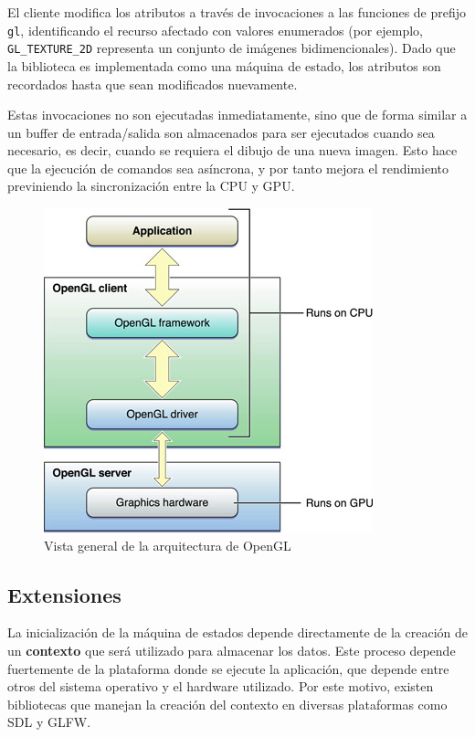 El cliente modifica los atributos a través de invocaciones a las funciones de prefijo \verb|gl|, identificando el recurso afectado con valores enumerados (por ejemplo, \verb|GL_TEXTURE_2D| representa un conjunto de imágenes bidimencionales). Dado que la biblioteca es implementada como una máquina de estado, los atributos son recordados hasta que sean modificados nuevamente.

Estas invocaciones no son ejecutadas inmediatamente, sino que de forma similar a un buffer de entrada/salida son almacenados para ser ejecutados cuando sea necesario, es decir, cuando se requiera el dibujo de una nueva imagen. Esto hace que la ejecución de comandos sea asíncrona, y por tanto mejora el rendimiento previniendo la sincronización entre la CPU y GPU.

\vspace{5mm}
\begin{figure}[h]
	\centering
	\includegraphics[width=.7\linewidth]{assets/cpu_gpu}
	\caption{Vista general de la arquitectura de OpenGL}
	\label{img:gpucpugl}
\end{figure}

\subsection{Extensiones}
La inicialización de la máquina de estados depende directamente de la creación de un \textbf{contexto} que será utilizado para almacenar los datos. Este proceso depende fuertemente de la plataforma donde se ejecute la aplicación, que depende entre otros del sistema operativo y el hardware utilizado. Por este motivo, existen bibliotecas que manejan la creación del contexto en diversas plataformas como SDL y GLFW.
	

